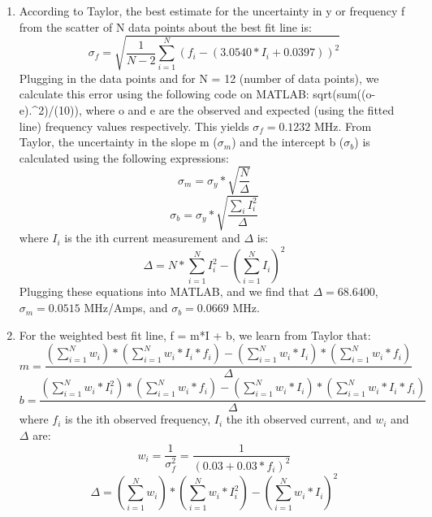\documentclass{article}
\begin{document}
\begin{enumerate}
    \item According to Taylor, the best estimate for the uncertainty in y or frequency f from the scatter of N data points about the best fit line is:
    \begin{equation}
        \sigma_f = \sqrt{\frac{1}{N-2}\sum_{i=1}^N(f_i-(3.0540*I_i + 0.0397))^2}
    \end{equation}
    Plugging in the data points and for N = 12 (number of data points), we calculate this error using the following code on MATLAB: sqrt(sum((o-e).\^{}2)/(10)), where o and e are the observed and expected (using the fitted line) frequency values respectively. This yields $\sigma_f = 0.1232$ MHz. From Taylor, the uncertainty in the slope m ($\sigma_m$) and the intercept b ($\sigma_b$) is calculated using the following expressions:
    \begin{equation}
        \sigma_m = \sigma_y*\sqrt{\frac{N}{\Delta}}
    \end{equation}
    \begin{equation}
        \sigma_b = \sigma_y*\sqrt{\frac{\sum_{i} I_i^2}{\Delta}}
    \end{equation}
    where $I_i$ is the ith current measurement and $\Delta$ is:
    \begin{equation}
        \Delta = N*\sum_{i=1}^N I_i^2 - (\sum_{i=1}^N I_i)^2
    \end{equation}
    Plugging these equations into MATLAB, and we find that $\Delta = 68.6400$, $\sigma_m = 0.0515$ MHz/Amps, and $\sigma_b = 0.0669$ MHz. 
    \item For the weighted best fit line, f = m*I + b, we learn from Taylor that:
    \begin{equation}
        m = \frac{(\sum_{i=1}^N w_i)*(\sum_{i=1}^N w_i*I_i*f_i) - (\sum_{i=1}^N w_i * I_i)*(\sum_{i=1}^N w_i*f_i)}{\Delta}
    \end{equation}
    \begin{equation}
        b = \frac{(\sum_{i=1}^N w_i*I_i^2)*(\sum_{i=1}^N w_i*f_i) - (\sum_{i=1}^N w_i * I_i)*(\sum_{i=1}^N w_i*I_i*f_i)}{\Delta}
    \end{equation}
    where $f_i$ is the ith observed frequency, $I_i$ the ith observed current, and $w_i$ and $\Delta$ are:
    \begin{equation}
        w_i = \frac{1}{\sigma_f^2} = \frac{1}{(0.03 + 0.03 * f_i)^2}
    \end{equation}
    \begin{equation}
        \Delta = (\sum_{i=1}^N w_i)*(\sum_{i=1}^N w_i*I_i^2) - (\sum_{i=1}^N w_i * I_i)^2

\end{equation}
\end{enumerate}
\end{document}

